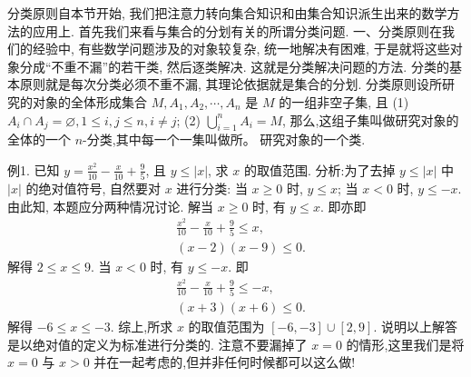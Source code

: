 
分类原则自本节开始, 我们把注意力转向集合知识和由集合知识派生出来的数学方法的应用上.
首先我们来看与集合的分划有关的所谓分类问题.
一、分类原则在我们的经验中, 有些数学问题涉及的对象较复杂, 统一地解决有困难, 于是就将这些对象分成“不重不漏”的若干类, 然后逐类解决.
这就是分类解决问题的方法.
分类的基本原则就是每次分类必须不重不漏, 其理论依据就是集合的分划.
分类原则设所研究的对象的全体形成集合 $M, A_1, A_2, \cdots, A_n$ 是 $M$ 的一组非空子集, 且
(1) $A_i \cap A_j=\varnothing, 1 \leqslant i, j \leqslant n, i \neq j$;
(2) $\bigcup_{i=1}^n A_i=M$,
那么,这组子集叫做研究对象的全体的一个 $n$-分类,其中每一个一集叫做所。 研究对象的一个类.



例1. 已知 $y=\frac{x^2}{10}-\frac{x}{10}+\frac{9}{5}$, 且 $y \leqslant|x|$, 求 $x$ 的取值范围.
分析:为了去掉 $y \leqslant|x|$ 中 $|x|$ 的绝对值符号, 自然要对 $x$ 进行分类: 当 $x \geqslant 0$ 时, $y \leqslant x$; 当 $x<0$ 时, $y \leqslant-x$. 由此知, 本题应分两种情况讨论.
解当 $x \geqslant 0$ 时, 有 $y \leqslant x$. 即亦即
$$
\begin{aligned}
& \frac{x^2}{10}-\frac{x}{10}+\frac{9}{5} \leqslant x, \\
& (x-2)(x-9) \leqslant 0 .
\end{aligned}
$$
解得 $2 \leqslant x \leqslant 9$.
当 $x<0$ 时, 有 $y \leqslant-x$. 即
$$
\begin{aligned}
& \frac{x^2}{10}-\frac{x}{10}+\frac{9}{5} \leqslant-x, \\
& (x+3)(x+6) \leqslant 0 .
\end{aligned}
$$
解得 $-6 \leqslant x \leqslant-3$.
综上,所求 $x$ 的取值范围为 $[-6,-3] \cup[2,9]$.
说明以上解答是以绝对值的定义为标准进行分类的.
注意不要漏掉了 $x=0$ 的情形,这里我们是将 $x=0$ 与 $x>0$ 并在一起考虑的,但并非任何时候都可以这么做!



